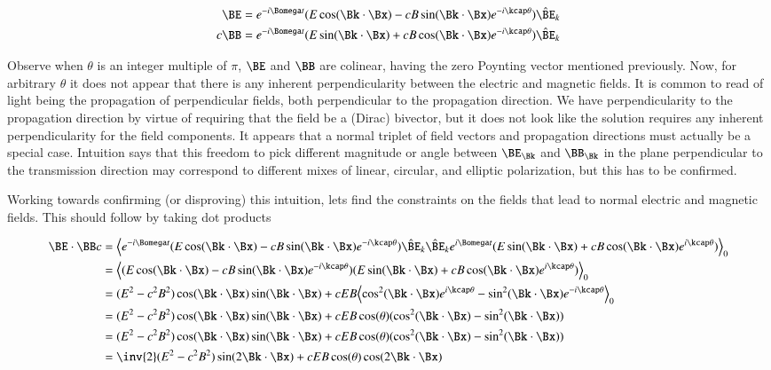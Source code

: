 \begin{align}\label{eqn:fieldsPolar}
\BE &= e^{-i\Bomega t} (E \cos(\Bk \cdot \Bx) - c B \sin(\Bk \cdot \Bx) e^{-i \kcap\theta}) \hat{\BE}_k \\
c \BB &= e^{-i\Bomega t} (E \sin(\Bk \cdot \Bx) + c B \cos(\Bk \cdot \Bx) e^{-i \kcap\theta}) \hat{\BE}_k
\end{align}

Observe when $\theta$ is an integer multiple of $\pi$, $\BE$ and $\BB$ are colinear, having the zero Poynting vector mentioned previously.
Now, for arbitrary $\theta$ it does not appear that there is any inherent perpendicularity between the electric and magnetic fields.  It is common
to read of light being the propagation of perpendicular fields, both perpendicular to the propagation direction.  We have perpendicularity to the
propagation direction by virtue of requiring that the field be a (Dirac) bivector, but it does not look like the solution requires any inherent perpendicularity for the field components.  It appears that a normal triplet of field vectors and propagation directions must actually be a special case.
Intuition says that this freedom to pick different magnitude or angle between $\BE_\Bk$ and $\BB_\Bk$ in the plane perpendicular to the transmission direction may correspond to different mixes of linear, circular, and elliptic polarization, but this has to be confirmed.

Working towards confirming (or disproving) this intuition, lets find the constraints on the fields that lead to normal electric and magnetic fields.  This should follow by taking dot products

\begin{align*}
\BE \cdot \BB c
&=
\gpgradezero{
e^{-i\Bomega t} (E \cos(\Bk \cdot \Bx) - c B \sin(\Bk \cdot \Bx) e^{-i \kcap\theta}) \hat{\BE}_k
\hat{\BE}_k
e^{i\Bomega t} (E \sin(\Bk \cdot \Bx) + c B \cos(\Bk \cdot \Bx) e^{i \kcap\theta})
} \\
&=
\gpgradezero{
(E \cos(\Bk \cdot \Bx) - c B \sin(\Bk \cdot \Bx) e^{-i \kcap\theta})
(E \sin(\Bk \cdot \Bx) + c B \cos(\Bk \cdot \Bx) e^{i \kcap\theta})
} \\
&=
(E^2 - c^2 B^2) \cos(\Bk \cdot \Bx) \sin(\Bk \cdot \Bx)
+ c E B
\gpgradezero{
\cos^2(\Bk \cdot \Bx) e^{i \kcap \theta}
-\sin^2(\Bk \cdot \Bx) e^{-i \kcap \theta}
} \\
&=
(E^2 - c^2 B^2) \cos(\Bk \cdot \Bx) \sin(\Bk \cdot \Bx)
+ c E B \cos(\theta) ( \cos^2(\Bk \cdot \Bx) -\sin^2(\Bk \cdot \Bx) ) \\
&=
(E^2 - c^2 B^2) \cos(\Bk \cdot \Bx) \sin(\Bk \cdot \Bx)
+ c E B \cos(\theta) ( \cos^2(\Bk \cdot \Bx) -\sin^2(\Bk \cdot \Bx) ) \\
&=
\inv{2} (E^2 - c^2 B^2) \sin(2 \Bk \cdot \Bx)
+ c E B \cos(\theta) \cos(2 \Bk \cdot \Bx) \\
\end{align*}

